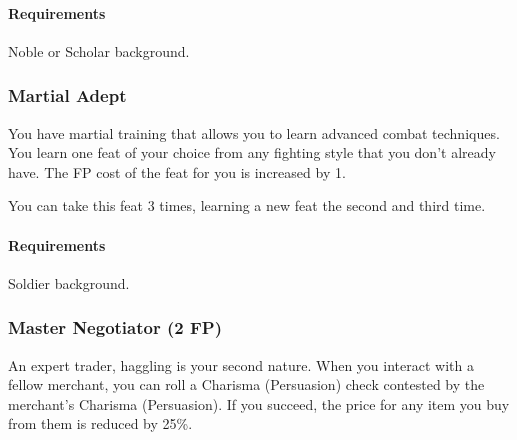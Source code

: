     \paragraph{Requirements} Noble or Scholar background.
%
\subsubsection{Martial Adept} \label{feat::martialadept}
    You have martial training that allows you to learn advanced combat techniques.
    You learn one feat of your choice from any fighting style that you don't already have.
    The FP cost of the feat for you is increased by 1.

    You can take this feat 3 times, learning a new feat the second and third time.
    \paragraph{Requirements} Soldier background.
\subsubsection{Master Negotiator (2 FP)} \label{feat::masternegotiator}
    An expert trader, haggling is your second nature.
    When you interact with a fellow merchant, you can roll a Charisma (Persuasion) check contested by the merchant's Charisma (Persuasion).
    If you succeed, the price for any item you buy from them is reduced by 25\%.

